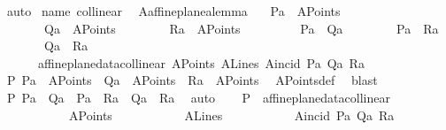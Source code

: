 \begin{isabellebody}
\ auto\isanewline
{}\isamarkupfalse%
%
\endisatagproof
{\isafoldproof}%
%
\isadelimproof
\isanewline
%
\endisadelimproof
\isanewline
{}\isamarkupfalse%
\ name{\isacharcolon}{\kern0pt}\ collinear\isanewline
\isanewline
{}\isamarkupfalse%
\ \ A{}affine{\isacharunderscore}{\kern0pt}plane{\isacharunderscore}{\kern0pt}a{}{\isacharunderscore}{\kern0pt}lemma{\isacharcolon}{\kern0pt}\isanewline
\ \ \ {\isachardoublequoteopen}Pa\ {\isasymin}\ A{}Points\ {\isasymand}\isanewline
\ \ \ \ \ \ \ Qa\ {\isasymin}\ A{}Points\ {\isasymand}\isanewline
\ \ \ \ \ \ \ Ra\ {\isasymin}\ A{}Points{\isachardoublequoteclose}\ \ \isanewline
\ \ \ \ \ \ \ {\isachardoublequoteopen}Pa\ {\isasymnoteq}\ Qa\ {\isasymand}\isanewline
\ \ \ \ \ \ \ Pa\ {\isasymnoteq}\ Ra\ {\isasymand}\isanewline
\ \ \ \ \ \ \ Qa\ {\isasymnoteq}\ Ra{\isachardoublequoteclose}\ \ \ \isanewline
\ \ \ \ {\isachardoublequoteopen}{\isasymnot}\ \ affine{\isacharunderscore}{\kern0pt}plane{\isacharunderscore}{\kern0pt}data{\isachardot}{\kern0pt}collinear\ A{}Points\ A{}Lines\ A{}incid\ Pa\ Qa\ Ra{\isachardoublequoteclose}\isanewline
%
\isadelimproof
%
\endisadelimproof
%
\isatagproof
{}\isamarkupfalse%
\ {\isacharminus}{\kern0pt}\isanewline
\ \ \isamarkupfalse%
\ P{}{\isacharcolon}{\kern0pt}\ {\isachardoublequoteopen}Pa\ {\isasymin}\ A{}Points\ {\isasymand}\ Qa\ {\isasymin}\ A{}Points\ {\isasymand}\ Ra\ {\isasymin}\ A{}Points{\isachardoublequoteclose}\ \isamarkupfalse%
\ A{}Points{\isacharunderscore}{\kern0pt}def\ \isamarkupfalse%
\ blast\isanewline
\ \ \isamarkupfalse%
\ P{}{\isacharcolon}{\kern0pt}\ {\isachardoublequoteopen}Pa\ {\isasymnoteq}\ Qa\ {\isasymand}\ Pa\ {\isasymnoteq}\ Ra\ {\isasymand}\ Qa\ {\isasymnoteq}\ Ra{\isachardoublequoteclose}\ \isamarkupfalse%
\ auto\isanewline
\ \ \isamarkupfalse%
\ P{}{\isacharcolon}{\kern0pt}\ {\isachardoublequoteopen}{\isasymnot}\ affine{\isacharunderscore}{\kern0pt}plane{\isacharunderscore}{\kern0pt}data{\isachardot}{\kern0pt}collinear\isanewline
\ \ \ \ \ \ \ \ \ \ \ A{}Points\isanewline
\ \ \ \ \ \ \ \ \ \ \ A{}Lines\isanewline
\ \ \ \ \ \ \ \ \ \ \ A{}incid\ Pa\ Qa\ Ra{\isachardoublequoteclose}\isanewline

\end{isabellebody}
